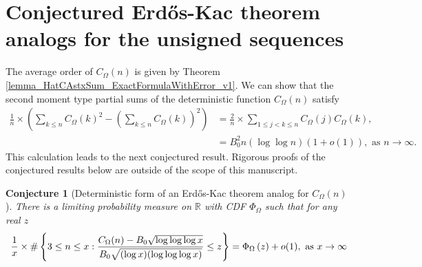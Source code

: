 \documentclass[11pt,reqno,a4letter]{article}
\newcommand{\hlocalref}[1]{\hyperref[#1]{\ref{#1}}}
\numberwithin{equation}{section}
\numberwithin{figure}{section}
\numberwithin{table}{section}
\theoremstyle{plain}
\newtheorem{conjecture}[theorem]{Conjecture}
\numberwithin{theorem}{section}
\theoremstyle{definition}
\begin{document}
\section{Conjectured Erd\H{o}s-Kac theorem analogs for the unsigned sequences} 
\label{subSection_ErdosKacTheorem_Analogs} 

The average order of $C_{\Omega}(n)$ is given by 
Theorem \hlocalref{lemma_HatCAstxSum_ExactFormulaWithError_v1}. 
We can show that the 
second moment type partial sums of the deterministic function $C_{\Omega}(n)$ satisfy 
\begin{align*}
\frac{1}{n} \times \left(\sum_{k \leq n} C_{\Omega}(k)^2 - 
     \left(\sum_{k \leq n} C_{\Omega}(k)\right)^2\right) & = 
     \frac{2}{n} \times \sum_{1 \leq j < k \leq n} C_{\Omega}(j) C_{\Omega}(k), \\ 
     & = 
     B_0^2 n (\log\log n) (1 + o(1)), \text{ as } n \rightarrow \infty. 
\end{align*}
This calculation leads to the next conjectured result. 
Rigorous proofs of the conjectured results below are outside of the scope of this manuscript. 

\begin{conjecture}[Deterministic form of an Erd\H{o}s-Kac theorem analog for $C_{\Omega}(n)$]
\label{conj_DetFormOfEKTypeThmForCOmegan_v1} 
There is a limiting probability measure on $\mathbb{R}$ with CDF $\Phi_{\Omega}$ such that 
for any real $z$ 
\begin{equation} 
\notag
\frac{1}{x} \times \#\left\{3 \leq n \leq x: 
     \frac{C_{\Omega}(n) - B_0 \sqrt{\log\log\log x}}{ 
     B_0 \sqrt{(\log x) (\log\log\log x)}} \leq z\right\} = 
     \Phi_{\Omega}\left(z\right) + o(1), 
     \mathrm{\ as\ } x \rightarrow \infty
\end{equation}
\end{conjecture} 
\end{document}
